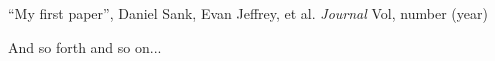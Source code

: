 \item ``My first paper'', Daniel Sank, Evan Jeffrey, et al. \emph{Journal} Vol, number (year)
\item And so forth and so on...
